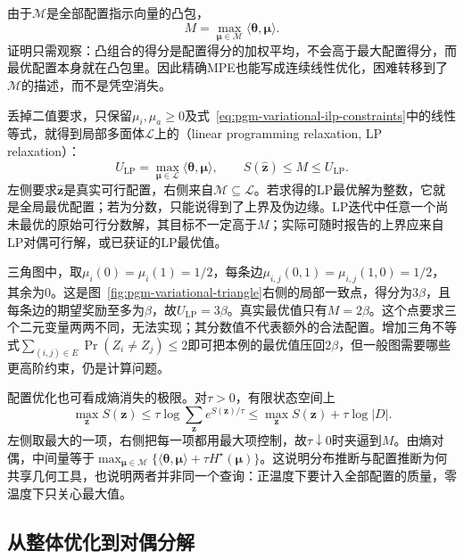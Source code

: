 由于$\mathcal M$是全部配置指示向量的凸包，
\begin{equation}
  M=\max_{\bm{\mu}\in\mathcal M}
          \langle\bm{\theta},\bm{\mu}\rangle.
  \label{eq:pgm-variational-mpe-marginal}
\end{equation}
证明只需观察：凸组合的得分是配置得分的加权平均，不会高于最大配置得分，而最优配置本身就在凸包里。因此精确MPE也能写成连续线性优化，困难转移到了$\mathcal M$的描述，而不是凭空消失。

丢掉二值要求，只保留$\mu_i,\mu_a\geq0$及式~\eqref{eq:pgm-variational-ilp-constraints}中的线性等式，就得到局部多面体$\mathcal L$上的（linear programming relaxation, LP relaxation）：
\begin{equation}
  U_{\mathrm{LP}}
     =\max_{\bm{\mu}\in\mathcal L}
               \langle\bm{\theta},\bm{\mu}\rangle,
  \qquad
  S(\widehat{\bm z})\leq M\leq U_{\mathrm{LP}}.
  \label{eq:pgm-variational-lp-bound}
\end{equation}
左侧要求$\widehat{\bm z}$是真实可行配置，右侧来自$\mathcal M\subseteq\mathcal L$。若求得的LP最优解为整数，它就是全局最优配置；若为分数，只能说得到了上界及伪边缘。LP迭代中任意一个尚未最优的原始可行分数解，其目标不一定高于$M$；实际可随时报告的上界应来自LP对偶可行解，或已获证的LP最优值。

三角图中，取$\mu_i(0)=\mu_i(1)=1/2$，每条边$\mu_{i,j}(0,1)=\mu_{i,j}(1,0)=1/2$，其余为$0$。这是图~\ref{fig:pgm-variational-triangle}右侧的局部一致点，得分为$3\beta$，且每条边的期望奖励至多为$\beta$，故$U_{\mathrm{LP}}=3\beta$。真实最优值只有$M=2\beta$。这个点要求三个二元变量两两不同，无法实现；其分数值不代表额外的合法配置。增加三角不等式$\sum_{(i,j)\in E}\Pr(Z_i\ne Z_j)\leq2$即可把本例的最优值压回$2\beta$，但一般图需要哪些更高阶约束，仍是计算问题。

配置优化也可看成熵消失的极限。对$\tau>0$，有限状态空间上
\[
  \max_{\bm z}S(\bm z)
  \leq \tau\log\sum_{\bm z}e^{S(\bm z)/\tau}
  \leq \max_{\bm z}S(\bm z)+\tau\log|D|.
\]
左侧取最大的一项，右侧把每一项都用最大项控制，故$\tau\downarrow0$时夹逼到$M$。由熵对偶，中间量等于$\max_{\bm{\mu}\in\mathcal M}\{\langle\bm{\theta},\bm{\mu}\rangle+\tau H^\star(\bm{\mu})\}$。这说明分布推断与配置推断为何共享几何工具，也说明两者并非同一个查询：正温度下要计入全部配置的质量，零温度下只关心最大值。

\subsection{从整体优化到对偶分解}
\label{sec:pgm-variational-dual-decomposition}
\label{sec:pgm-variational-dual-trw}

